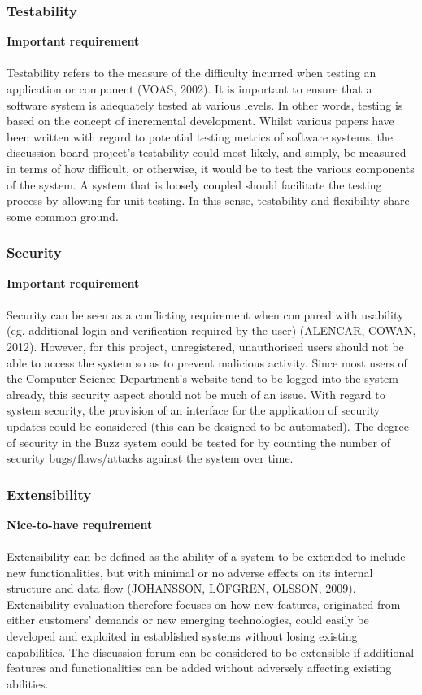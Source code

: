 \documentclass[a4paper]{article}
\begin{document}
\subsubsection{Testability}
\textbf{Important requirement}
\\
\\Testability refers to the measure of the difficulty incurred when testing an application or component (VOAS, 2002). It is important to ensure that a software system is adequately tested at various levels. In other words, testing is based on the concept of incremental development. Whilst various papers have been written with regard to potential testing metrics of software systems, the discussion board project’s testability could most likely, and simply, be measured in terms of how difficult, or otherwise, it would be to test the various components of the system. A system that is loosely coupled should facilitate the testing process by allowing for unit testing. In this sense, testability and flexibility share some common ground.


\subsubsection{Security}
\textbf{Important requirement}
\\
\\Security can be seen as a conflicting requirement when compared with usability (eg. additional login and verification required by the user) (ALENCAR, COWAN, 2012). However, for this project, unregistered, unauthorised users should not be able to access the system so as to prevent malicious activity. Since most users of the Computer Science Department’s website tend to be logged into the system already, this security aspect should not be much of an issue. With regard to system security, the provision of an interface for the application of security updates could be considered (this can be designed to be automated). The degree of security in the Buzz system could be tested for by counting the number of security bugs/flaws/attacks against the system over time.

\subsubsection{Extensibility}
\textbf{Nice-to-have requirement}
\\
\\Extensibility can be defined as the ability of a system to be extended to include new functionalities, but with minimal or no adverse effects on its internal structure and data flow (JOHANSSON, LÖFGREN, OLSSON, 2009).  Extensibility evaluation therefore focuses on how new features, originated from either customers’ demands or new emerging technologies, could easily be developed and exploited in established systems without losing existing capabilities. The discussion forum can be considered to be extensible if additional features and functionalities can be added without adversely affecting existing abilities.
\end{document}
